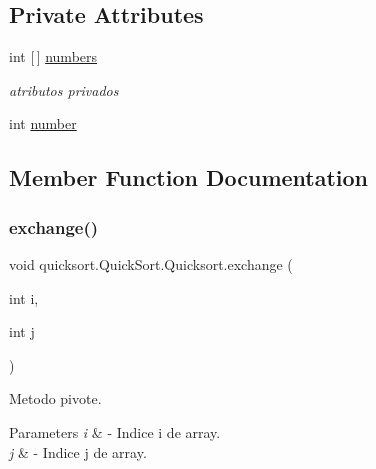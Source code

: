 \subsection*{Private Attributes}
\begin{DoxyCompactItemize}
\item 
int \mbox{[}$\,$\mbox{]} \hyperlink{classquicksort_1_1_quick_sort_1_1_quicksort_aeb7f48cb8d62acde77b12cf78128aced}{numbers}
\begin{DoxyCompactList}\small\item\em atributos privados \end{DoxyCompactList}\item 
int \hyperlink{classquicksort_1_1_quick_sort_1_1_quicksort_a1ccb00d85f76e7150e0746b42038225f}{number}
\end{DoxyCompactItemize}


\subsection{Member Function Documentation}
\hypertarget{classquicksort_1_1_quick_sort_1_1_quicksort_a83169b60ccb0c644794cb7b16d21edd6}{}\label{classquicksort_1_1_quick_sort_1_1_quicksort_a83169b60ccb0c644794cb7b16d21edd6} 
\subsubsection{\texorpdfstring{exchange()}{exchange()}}
{\footnotesize\ttfamily void quicksort.\+Quick\+Sort.\+Quicksort.\+exchange (\begin{DoxyParamCaption}\item[{int}]{i,  }\item[{int}]{j }\end{DoxyParamCaption})\hspace{0.3cm}{\ttfamily [private]}}



Metodo pivote. 


\begin{DoxyParams}{Parameters}
{\em i} & -\/ Indice i de array. \\
\hline
{\em j} & -\/ Indice j de array. \\
\hline
\end{DoxyParams}
\hypertarget{classquicksort_1_1_quick_sort_1_1_quicksort_a6790f4b784050741faeed056b58de4ba}{}\label{classquicksort_1_1_quick_sort_1_1_quicksort_a6790f4b784050741faeed056b58de4ba} 
